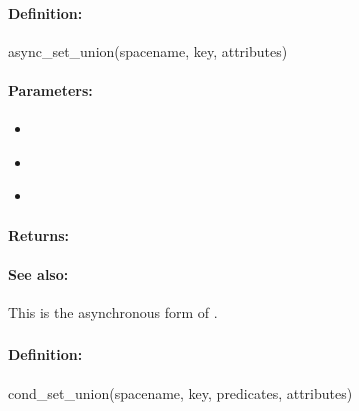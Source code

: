 \paragraph{Definition:}
\begin{rubycode}
async_set_union(spacename, key, attributes)
\end{rubycode}

\paragraph{Parameters:}
\begin{itemize}[noitemsep]
\item {}\\

\item {}\\

\item {}\\

\end{itemize}

\paragraph{Returns:}


\paragraph{See also:}  This is the asynchronous form of .

\pagebreak
\subsubsection{}
\label{api:ruby:cond_set_union}


\paragraph{Definition:}
\begin{rubycode}
cond_set_union(spacename, key, predicates, attributes)
\end{rubycode}

